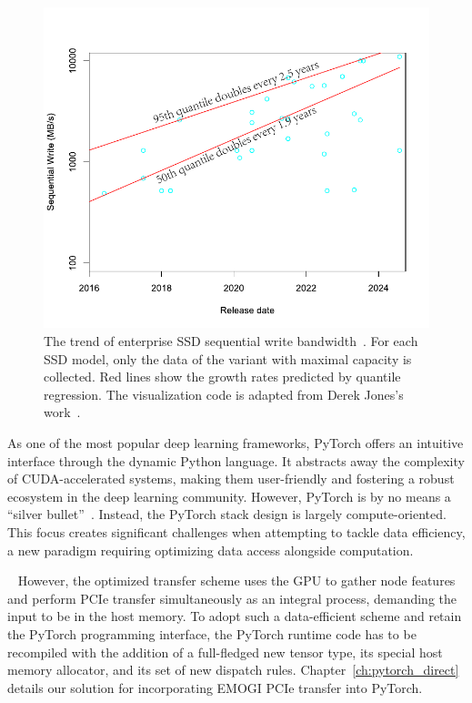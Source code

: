 \begin{figure}[]
    \centering
    \includegraphics[width=0.8\linewidth]{figures/Intro/SSDTrendBandwidth.pdf}
    \caption{The trend of enterprise SSD sequential write bandwidth~\cite{techpowerupEnterpriseSSDDatabase2024}. For each SSD model, only the data of the variant with maximal capacity is collected. Red lines show the growth rates predicted by quantile regression. The visualization code is adapted from Derek Jones's work~\cite{derekjonesShapeCodeMemory2020}. }
    \label{fig:ssd_trend_bandwidth}
\end{figure}

As one of the most popular deep learning frameworks, PyTorch offers an intuitive interface through the dynamic Python language. It abstracts away the complexity of CUDA-accelerated systems, making them user-friendly and fostering a robust ecosystem in the deep learning community. However, PyTorch is by no means a ``silver bullet''~\cite{brooksNoSilverBullet1987}. Instead, the PyTorch stack design is largely compute-oriented. This focus creates significant challenges when attempting to tackle data efficiency, a new paradigm requiring optimizing data access alongside computation.



~\cite{minEMOGIEfficientMemoryaccess2020,minLargeGraphConvolutional2021,minFinegrainedMemoryAccess2022}  However, the optimized transfer scheme uses the GPU to gather node features and perform PCIe transfer simultaneously as an integral process, demanding the input to be in the host memory.
To adopt such a data-efficient scheme and retain the PyTorch programming interface, the PyTorch runtime code has to be recompiled with the addition of a full-fledged new tensor type, its special host memory allocator, and its set of new dispatch rules. 
Chapter~\ref{ch:pytorch_direct} details our solution for incorporating EMOGI PCIe transfer into PyTorch.


